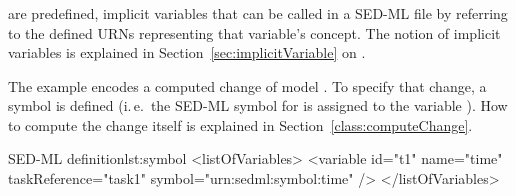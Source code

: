 \subsubsection{}
\label{sec:symbol}

 are predefined, implicit variables that can be called in a SED-ML file by referring to the defined URNs representing that variable's concept. The notion of implicit variables is explained in Section~\ref{sec:implicitVariable} on .

The example encodes a computed change of model . To specify that change, a symbol is defined (i.\,e.\  the SED-ML symbol for  is assigned to the variable ). How to compute the change itself is explained in Section~\ref{class:computeChange}.
%
\begin{myXmlLst}{SED-ML  definition}{lst:symbol}
  <listOfVariables>
    <variable id="t1" name="time" taskReference="task1" 
      symbol="urn:sedml:symbol:time" />
  </listOfVariables>
\end{myXmlLst}


